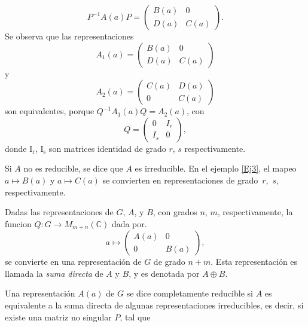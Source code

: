 \documentclass[12pt]{book}
\theoremstyle{definition}
\newcounter{in}
\begin{document}
\begin{equation*}
  P^{-1}A\left(a\right)P=
  \begin{pmatrix}
    B\left(a\right) & 0 \\
    D\left(a\right) & C\left(a\right)
  \end{pmatrix}. 
\end{equation*}  
Se observa que las representaciones
\begin{equation*}
  A_{1}\left(a\right)=
  \begin{pmatrix}
    B\left(a\right) & 0 \\
    D\left(a\right) & C\left(a\right)
  \end{pmatrix}
\end{equation*}
y
\begin{equation*} 
   A_{2}\left(a\right)=
  \begin{pmatrix}
    C\left(a\right) & D\left(a\right) \\
    0 & C\left(a\right)
  \end{pmatrix}
\end{equation*}
son equivalentes, porque
$Q^{-1}A_{1}\left(a\right)Q=A_{2}\left(a\right)$, con
\begin{equation*}
  Q=
  \begin{pmatrix}
    0 & I_{r} \\ 
    I_{s} & 0
  \end{pmatrix},
\end{equation*}
donde $ \mathrm{I_{r}}$, $ \mathrm{I_{s}}$ son matrices identidad de
grado $r$, $s$ respectivamente.

Si $A$ no es reducible, se dice que $A$ es irreducible. En el ejemplo
\ref{Ej3}, el mapeo $a \mapsto B\left(a\right)$ y
$a \mapsto C\left(a\right)$ se convierten en representaciones de
grado~$r$,~$s$, respectivamente.

Dadas las representaciones de $G$, $A$, y $B$, con grados $n$, $m$,
respectivamente, la funcion $Q\colon G\to M_{m+n}(\mathbb{C})$ dada por.
\begin{equation*}
  a\mapsto
  \begin{pmatrix}
    A\left(a\right) & 0 \\ 
    0 & B\left(a\right)
  \end{pmatrix}, 
\end{equation*}
se convierte en una representación de $G$ de grado $n+m$. Esta
representación es llamada la \emph{suma directa} de $A$ y
$B$, y es denotada por $A \oplus B$.

Una representación $A\left(a\right)$ de $G$ se dice completamente
reducible si $A$ es equivalente a la suma directa de algunas
representaciones irreducibles, es decir, si existe una matriz no singular
$P$, tal que
\end{document}

